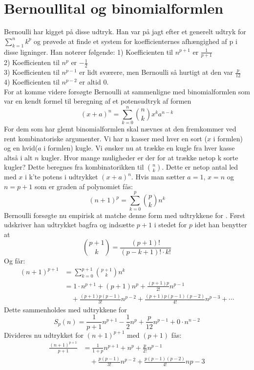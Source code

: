 \section{Bernoullital og binomialformlen}
Bernoulli har kigget på disse udtryk. Han var på jagt efter et generelt udtryk for \(\sum_{k=1}^{n}k^p\) og prøvede at finde et system for koefficienternes afhængighed af p i disse ligninger.
Han noterer følgende:
1) Koefficienten til \(n^{p+1}\) er \(\frac{1}{p+1}\)\\
2) Koefficienten til \(n^p\) er \(-\frac{1}{2}\)\\
3) Koefficienten til \(n^{p-1}\) er lidt sværere, men Bernoulli så hurtigt at den var \(\frac{p}{12}\)\\
4) Koefficienten til \(n^{p-2}\) er altid \(0\).\\
For at komme videre forsøgte Bernoulli at sammenligne med binomialformlen som var en kendt formel til 
beregning af et potensudtryk af formen  \[(x+a)^n=\sum_{k=0}^{n}\binom{n}{k}x^ka^{n-k}\]
For dem som har glemt binomialformlen skal nævnes at den fremkommer ved rent kombinatoriske argumenter. Vi har n kasser med hver en sort (\(x\) i formlen) og en hvid(\(a\) i formlen) kugle. Vi ønsker nu at trække en kugle fra hver kasse altså i alt \(n\) kugler. Hvor mange muligheder er der for at trække netop k sorte kugler? Dette beregnes fra kombinatorikken til \(\binom{n}{k}\). Dette er netop antal led med \(x\) i k’te potens i udtrykket \((x+a)^n\).
Hvis man sætter \(a=1\), \(x=n\) og \(n=p+1\) som er graden af polynomiet fås: \[(n+1)^p=\sum_{k=0}^{p}\binom{p}{k}n^k\]
Bernoulli forsøgte nu empirisk at matche denne form med udtrykkene for  . 
Først udskriver han udtrykket bagfra og indsætte \(p+1\) i stedet for \(p\) idet han benytter at 
\[\binom{p+1}{k}=\frac{(p+1)!}{(p-k+1)! \cdot k!}\]
Og får:
\begin{align*}
(n+1)^{p+1}&=\sum_{k=0}^{p+1}\binom{p+1}{k}n^k\\
&=1 \cdot n^{p+1}+(p+1)n^p+\frac{(p+1)p}{2!}n^{p-1}\\
& \quad +\frac{(p+1)p(p-1)}{3!}n^{p-2}+\frac{(p+1)p(p-1)(p-2)}{4!}n^{p-3}+ \dotsm
\end{align*}
Dette sammenholdes med udtrykkene for
\[S_{p}(n)=\frac{1}{p+1}n^{p+1}-\frac{1}{2}n^{p}+\frac{p}{12}n^{p-1}+0 \cdot n^{n-2}\]
 Divideres nu udtrykket  for \((n+1)^{p+1}\) med \((p+1)\) fås:
\begin{align*}
\frac{(n+1)^{p+1}}{p+1}&=\frac{1}{1+p}n^{p+1}+n^{p}+\frac{p}{2!}n^{p-1}\\
&\quad +\frac{p(p-1)}{3!}n^{p-2}+\frac{p(p-1)(p-2)}{4!}n{p-3}
\end{align*}
